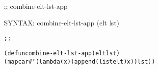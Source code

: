\begin{aibox}{\function}
;; combine-elt-lst-app

SYNTAX: combine-elt-lst-app (elt lst)
\end{aibox}

\begin{aibox}{\examples}

\end{aibox}

\begin{aibox}{\comments}

\end{aibox}
\begin{aibox}{\answers}

\end{aibox}
\begin{aibox}{\othercomments}

\end{aibox}
\begin{aibox}{\pseudocode}

\end{aibox}
\begin{aibox}{\code}

\begin{alltt}
;;%% code

(defun combine-elt-lst-app (elt lst)
            (mapcar #'(lambda (x) (append (list elt) x)) lst))

\end{alltt}
\end{aibox}
